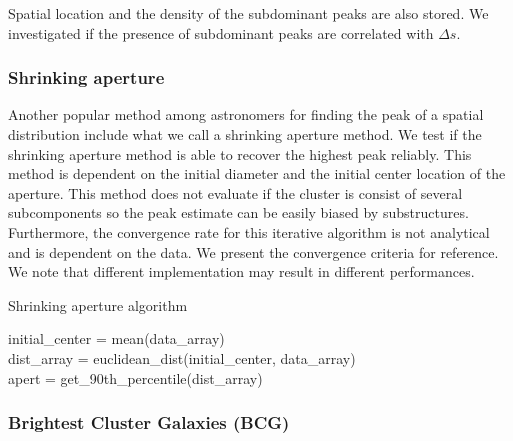 \documentclass[usenatbib]{mn2e}
\begin{document}
Spatial location and the density of the subdominant peaks are also stored.
We investigated if the presence of subdominant peaks are correlated with
$\Delta s$. 


\subsubsection{Shrinking aperture}
Another popular method among astronomers for finding the peak of a spatial
distribution include what we call a shrinking aperture method.
We test if the shrinking aperture method is able to recover the highest peak reliably.
This method is dependent on the initial diameter and the initial center location of the aperture.
This method does not evaluate if the cluster is consist of
several subcomponents so the peak estimate can be easily biased by
substructures. Furthermore, the convergence rate for this iterative algorithm is not
analytical and is dependent on the data. We present the
convergence criteria for reference. We note that different implementation may result in
different performances.
\begin{algorithm}
	\caption{Shrinking aperture algorithm}
	 \hrulefill

	initial_center = mean(data\_array)\\
 	dist\_array = euclidean_dist(initial_center, data_array)\\
 	apert = get\_90th\_percentile(dist\_array)\\ 
	   \hrulefill
 \end{algorithm}




\subsubsection{Brightest Cluster Galaxies (BCG)}
\end{document}
